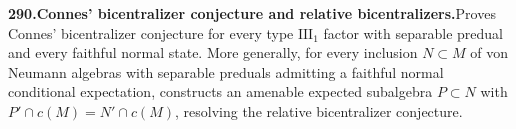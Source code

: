 \documentclass[11pt,a4paper]{article}
\begin{document}
  \par \begin{minipage}{\linewidth}
  \fontsize{10.5}{12.6}\selectfont\RaggedRight
  \hypertarget{result 290}{}
  {\bfseries\textcolor{muted}{290.}\enspace Connes' bicentralizer conjecture and relative bicentralizers.}\enspace Proves Connes' bicentralizer conjecture for every type $\mathrm{III}_1$ factor with separable predual and every faithful normal state. More generally, for every inclusion $N\subset M$ of von Neumann algebras with separable preduals admitting a faithful normal conditional expectation, constructs an amenable expected subalgebra $P\subset N$ with $P'\cap c(M)=N'\cap c(M)$, resolving the relative bicentralizer conjecture.\par
  \end{minipage}\par\vspace{5pt}
\end{document}
